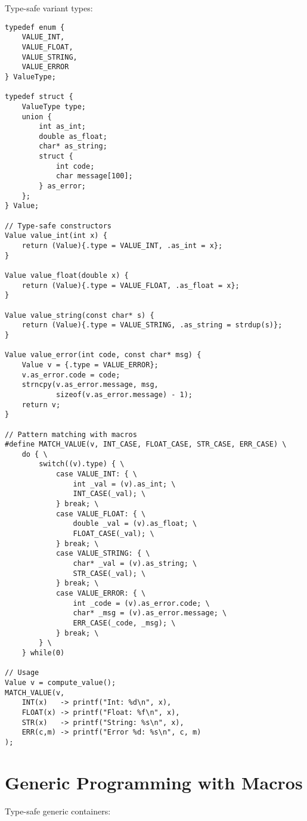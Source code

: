 \begin{description}[style=nextline,leftmargin=0pt]
Type-safe variant types:

\begin{lstlisting}
typedef enum {
    VALUE_INT,
    VALUE_FLOAT,
    VALUE_STRING,
    VALUE_ERROR
} ValueType;

typedef struct {
    ValueType type;
    union {
        int as_int;
        double as_float;
        char* as_string;
        struct {
            int code;
            char message[100];
        } as_error;
    };
} Value;

// Type-safe constructors
Value value_int(int x) {
    return (Value){.type = VALUE_INT, .as_int = x};
}

Value value_float(double x) {
    return (Value){.type = VALUE_FLOAT, .as_float = x};
}

Value value_string(const char* s) {
    return (Value){.type = VALUE_STRING, .as_string = strdup(s)};
}

Value value_error(int code, const char* msg) {
    Value v = {.type = VALUE_ERROR};
    v.as_error.code = code;
    strncpy(v.as_error.message, msg,
            sizeof(v.as_error.message) - 1);
    return v;
}

// Pattern matching with macros
#define MATCH_VALUE(v, INT_CASE, FLOAT_CASE, STR_CASE, ERR_CASE) \
    do { \
        switch((v).type) { \
            case VALUE_INT: { \
                int _val = (v).as_int; \
                INT_CASE(_val); \
            } break; \
            case VALUE_FLOAT: { \
                double _val = (v).as_float; \
                FLOAT_CASE(_val); \
            } break; \
            case VALUE_STRING: { \
                char* _val = (v).as_string; \
                STR_CASE(_val); \
            } break; \
            case VALUE_ERROR: { \
                int _code = (v).as_error.code; \
                char* _msg = (v).as_error.message; \
                ERR_CASE(_code, _msg); \
            } break; \
        } \
    } while(0)

// Usage
Value v = compute_value();
MATCH_VALUE(v,
    INT(x)   -> printf("Int: %d\n", x),
    FLOAT(x) -> printf("Float: %f\n", x),
    STR(x)   -> printf("String: %s\n", x),
    ERR(c,m) -> printf("Error %d: %s\n", c, m)
);
\end{lstlisting}

\section{Generic Programming with Macros}

Type-safe generic containers:


\end{description}
